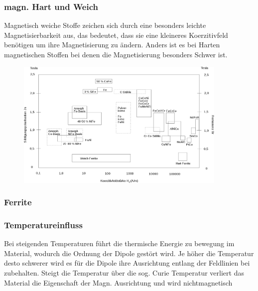         \subsubsection*{magn. Hart und Weich}
            Magnetisch weiche Stoffe zeichen sich durch eine besonders leichte Magnetisierbarkeit aus, das bedeutet,
            dass sie eine kleineres Koerzitivfeld benötigen um ihre Magnetisierung zu ändern. Anders ist es bei Harten
            magnetischen Stoffen bei denen die Magnetisierung besonders Schwer ist.
            \begin{figure}[H]
                \centering
                \includegraphics[width=0.9\textwidth]{Images/übersicht_Koerzitivfeldstärke.png}
            \end{figure}
        \subsubsection*{Ferrite}

        \subsubsection*{Temperatureinfluss}
            Bei steigenden Temperaturen führt die thermische Energie zu bewegung im Material, wodurch die Ordnung der
            Dipole gestört wird. Je höher die Temperatur desto schwerer wird es für die Dipole ihre Ausrichtung entlang
            der Feldlinien bei zubehalten. Steigt die Temperatur über die sog. Curie Temperatur verliert das Material
            die Eigenschaft der Magn. Ausrichtung und wird nichtmagnetisch
